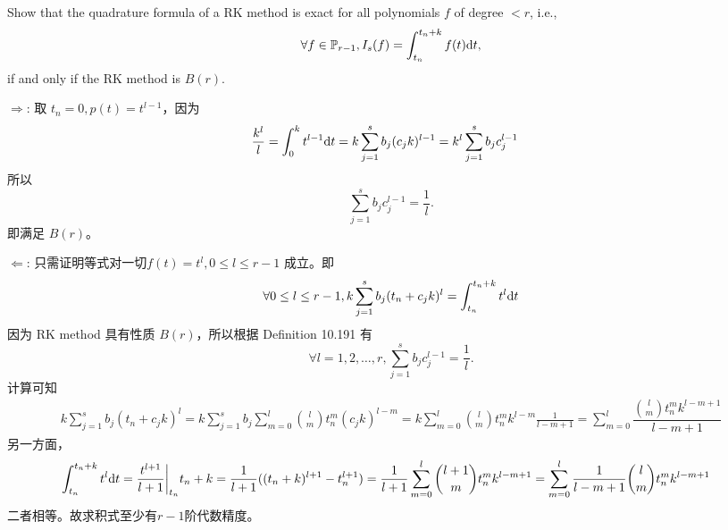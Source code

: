 \documentclass[lang=cn,a4paper,newtx,bibend=bibtex]{elegantpaper}
\begin{document}
\begin{prob}[Exercise 10.193]
  Show that the quadrature formula of a RK method is exact
  for all polynomials $f$ of degree $<r$, i.e.,
  \begin{equation*}
    \forall f\in \mathbb{P}_{r-1}, I_s(f) = \int_{t_n}^{t_n+k}{f(t)}{\mathrm{d} {t}},
  \end{equation*}
  if and only if the RK method is $B(r)$.
\end{prob}

\begin{solution}
  $\Rightarrow$: 
  取 $t_n=0, p(t) = t^{l-1}$，因为
  \begin{equation*}
    \begin{aligned}
      & \frac{k^l}{l}
      = \int_{0}^{k}{t^{l-1}}{\mathrm{d} {t}} 
      = k\sum_{j=1}^s b_j(c_jk)^{l-1} 
      = k^l\sum_{j=1}^s b_jc_j^{l-1}
    \end{aligned}
  \end{equation*}
  所以
  \begin{equation*}
    \sum_{j=1}^s b_jc_j^{l-1} = \frac 1l.
  \end{equation*}
  即满足 $B(r)$。

  $\Leftarrow$: 
  只需证明等式对一切$f(t)=t^l, 0\leq l\leq r-1$ 成立。即
  \begin{equation*}
    \forall 0\leq l\leq r-1, k\sum_{j=1}^s b_j(t_n+c_jk)^l = \int_{t_n}^{t_n+k}{t^l}{\mathrm{d} {t}}    
  \end{equation*}
  因为 RK method 具有性质 $B(r)$，所以根据 Definition 10.191 有
  \begin{equation*}
    \forall l = 1,2,\dots, r, \sum_{j=1}^s b_jc_j^{l-1} = \frac 1l.
  \end{equation*}
  计算可知
  \begin{equation*}
    \begin{aligned}
      k\sum_{j=1}^s b_j(t_n+c_jk)^l
      = k\sum_{j=1}^s b_j\sum_{m=0}^l \binom lm t_n^m (c_jk)^{l-m} 
      = k\sum_{m=0}^l \binom lm t_n^m k^{l-m} \frac{1}{l-m+1} 
      = \sum_{m=0}^l \dfrac{\binom lm t_n^m k^{l-m+1}}{l-m+1} 
    \end{aligned}
  \end{equation*}
  另一方面，
  \begin{equation*}
    \begin{aligned}
      & \int_{t_n}^{t_n+k}{t^l}{\mathrm{d} {t}} 
      =  \dfrac{t^{l+1}}{l+1}\bigg|_{t_n}{t_n+k} 
      =  \frac{1}{l+1}((t_n+k)^{l+1} - t_n^{l+1}) 
      =  \frac{1}{l+1}\sum_{m=0}^l \binom{l+1}{m} t_n^m k^{l-m+1} 
      =  \sum_{m=0}^l \frac{1}{l-m+1}\binom lm t_n^m k^{l-m+1} 
    \end{aligned}
  \end{equation*}
  二者相等。故求积式至少有$r-1$阶代数精度。
\end{solution}
\end{document}
